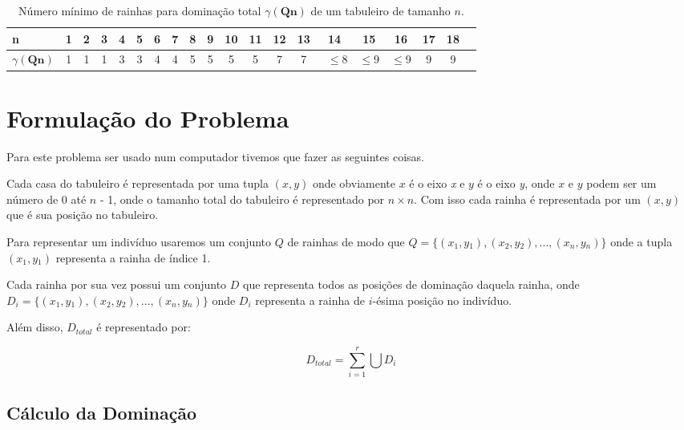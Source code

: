 \documentclass[
	article,			%
	11pt,				%
	oneside,			%
	a4paper,			%
	english,			%
	brazil,				%
	sumario=tradicional
	]{abntex2}
\begin{document}
\begin{table}[ht]
  \caption{Número mínimo de rainhas para dominação total $\gamma(\textbf{Qn})$ de um tabuleiro de tamanho $\textit{n}$.}
  \begin{tabular}{l*{18}{c}r}
    n              & 1 & 2 & 3 & 4 & 5  & 6 & 7 & 8 & 9 & 10 & 11 & 12 & 13 & 14 & 15 & 16 & 17 & 18 \\
    \hline
    $\gamma(\textbf{Qn})$ & 1 & 1 & 1 & 3 & 3 & 4 & 4 & 5 & 5 & 5 & 5 & 7 & 7 & ~$\leq$8 & $\leq$9 & $\leq$9  & 9 & 9 \\
  \end{tabular}
  \label{tabela1}
\end{table}


\section{Formulação do Problema}

Para este problema ser usado num computador tivemos que fazer as seguintes coisas. 

Cada casa do tabuleiro é representada por uma tupla $(x,y)$ onde obviamente $x$ é o eixo \textit{x} e $y$ é o eixo \textit{y}, onde $x$ e $y$ podem ser um número de 0 até $n$ - 1, onde o tamanho total do tabuleiro é representado por $n \times n$. Com isso cada rainha é representada por um $(x,y)$ que é sua posição no tabuleiro.

Para representar um indivíduo usaremos  um conjunto $Q$ de rainhas de modo que $Q=\{(x{_{1}},y{_{1}}), (x{_{2}},y{_{2}}), ..., (x{_{n}},y{_{n}})\}$ onde a tupla \textbf{$(x{_{1}},y{_{1}})$} representa a rainha de índice 1. 

Cada rainha por sua vez possui um conjunto $D$ que representa todos as posições de dominação daquela rainha, onde $D{_{i}}=\{(x{_{1}},y{_{1}}), (x{_{2}},y{_{2}}), ..., (x{_{n}},y{_{n}})\}$ onde $D{_{i}}$ representa a rainha de $i$-ésima posição no indivíduo.

Além disso, $D{_{total}}$ é representado por:

\begin{equation}
 D{_{total}}=\sum_{i=1}^{r}\bigcup D{_{i}}
\end{equation}

\subsection{Cálculo da Dominação}
\end{document}
